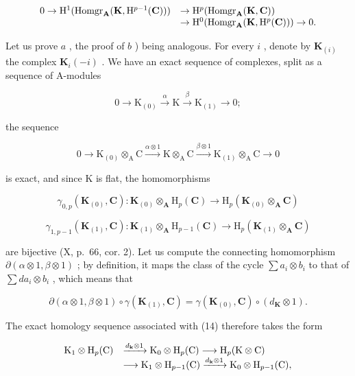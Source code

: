\[
\begin{array}{r l} 0 \to \mathrm{H} ^ {1} (\operatorname{Homgr} _ {\mathbf {A}} (\mathbf {K}, \mathrm{H} ^ {p - 1} (\mathbf {C}))) & \to \mathrm{H} ^ {p} (\operatorname{Homgr} _ {\mathbf {A}} (\mathbf {K}, \mathbf {C})) \\ & \to \mathrm{H} ^ {0} (\operatorname{Homgr} _ {\mathbf {A}} (\mathbf {K}, \mathrm{H} ^ {p} (\mathbf {C}))) \to 0. \end{array}
\]

Let us prove \(a\) , the proof of \(b\) ) being analogous. For every \(i\) , denote by \(\mathbf{K}_{(i)}\) the complex \(\mathbf{K}_i(-i)\) . We have an exact sequence of complexes, split as a sequence of A-modules

\[
0 \rightarrow \mathrm{K} _ {(0)} \xrightarrow {\alpha} \mathrm{K} \xrightarrow {\beta} \mathrm{K} _ {(1)} \rightarrow 0;
\]

the sequence

\[
0 \longrightarrow \mathrm{K} _ {(0)} \otimes_ {\mathrm{A}} \mathrm{C} \xrightarrow {\alpha \otimes 1} \mathrm{K} \otimes_ {\mathrm{A}} \mathrm{C} \xrightarrow {\beta \otimes 1} \mathrm{K} _ {(1)} \otimes_ {\mathrm{A}} \mathrm{C} \longrightarrow 0\tag{14}
\]

is exact, and since K is flat, the homomorphisms

\[
\gamma_ {0, p} (\mathbf {K} _ {(0)}, \mathbf {C}): \mathbf {K} _ {(0)} \otimes_ {\mathbf {A}} \mathrm{H} _ {p} (\mathbf {C}) \rightarrow \mathrm{H} _ {p} (\mathbf {K} _ {(0)} \otimes_ {\mathbf {A}} \mathbf {C})
\]

\[
\gamma_ {1, p - 1} (\mathbf {K} _ {(1)}, \mathbf {C}): \mathbf {K} _ {(1)} \otimes_ {\mathbf {A}} \mathrm{H} _ {p - 1} (\mathbf {C}) \rightarrow \mathrm{H} _ {p} (\mathbf {K} _ {(1)} \otimes_ {\mathbf {A}} \mathbf {C})
\]

are bijective (X, p.~66, cor. 2). Let us compute the connecting homomorphism \(\partial (\alpha \otimes 1, \beta \otimes 1)\) ; by definition, it maps the class of the cycle \(\sum a_i \otimes b_i\) to that of \(\sum da_i \otimes b_i\) , which means that

\[
\partial (\alpha \otimes 1, \beta \otimes 1) \circ \gamma (\mathbf {K} _ {(1)}, \mathbf {C}) = \gamma (\mathbf {K} _ {(0)}, \mathbf {C}) \circ (d _ {\mathbf {K}} \otimes 1).
\]

The exact homology sequence associated with (14) therefore takes the form

\[
\begin{array}{r l} \mathrm{K} _ {1} \otimes \mathrm{H} _ {p} (\mathrm{C}) & \xrightarrow {d _ {\mathbf {k}} \otimes 1} \mathrm{K} _ {0} \otimes \mathrm{H} _ {p} (\mathrm{C}) \longrightarrow \mathrm{H} _ {p} (\mathrm{K} \otimes \mathrm{C}) \\ & \longrightarrow \mathrm{K} _ {1} \otimes \mathrm{H} _ {p - 1} (\mathrm{C}) \xrightarrow {d _ {\mathbf {k}} \otimes 1} \mathrm{K} _ {0} \otimes \mathrm{H} _ {p - 1} (\mathrm{C}), \end{array}
\]

